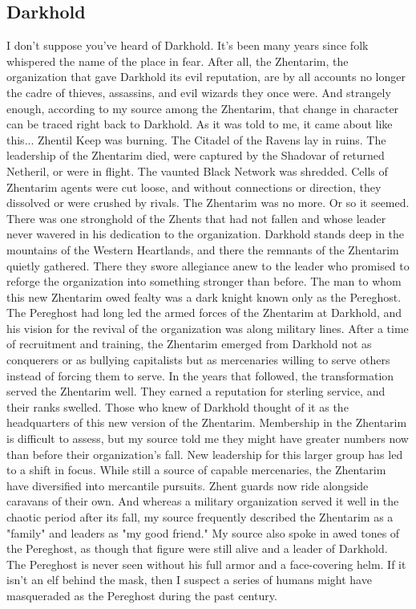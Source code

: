 \documentclass[10pt,a4paper,twoside,twocolumn,openany,bg=print,nodeprecatedcode]{dndbook}
\begin{document}
\subsection{Darkhold}
I don't suppose you've heard of Darkhold. It's been many years since folk whispered the name of the place in fear. After all, the Zhentarim, the organization that gave Darkhold its evil reputation, are by all accounts no longer the cadre of thieves, assassins, and evil wizards they once were. And strangely enough, according to my source among the Zhentarim, that change in character can be traced right back to Darkhold. As it was told to me, it came about like this...
Zhentil Keep was burning. The Citadel of the Ravens lay in ruins. The leadership of the Zhentarim died, were captured by the Shadovar of returned Netheril, or were in flight. The vaunted Black Network was shredded. Cells of Zhentarim agents were cut loose, and without connections or direction, they dissolved or were crushed by rivals. The Zhentarim was no more.
Or so it seemed. There was one stronghold of the Zhents that had not fallen and whose leader never wavered in his dedication to the organization. Darkhold stands deep in the mountains of the Western Heartlands, and there the remnants of the Zhentarim quietly gathered. There they swore allegiance anew to the leader who promised to reforge the organization into something stronger than before.
The man to whom this new Zhentarim owed fealty was a dark knight known only as the Pereghost. The Pereghost had long led the armed forces of the Zhentarim at Darkhold, and his vision for the revival of the organization was along military lines. After a time of recruitment and training, the Zhentarim emerged from Darkhold not as conquerers or as bullying capitalists but as mercenaries willing to serve others instead of forcing them to serve.
In the years that followed, the transformation served the Zhentarim well. They earned a reputation for sterling service, and their ranks swelled. Those who knew of Darkhold thought of it as the headquarters of this new version of the Zhentarim.
Membership in the Zhentarim is difficult to assess, but my source told me they might have greater numbers now than before their organization's fall. New leadership for this larger group has led to a shift in focus. While still a source of capable mercenaries, the Zhentarim have diversified into mercantile pursuits. Zhent guards now ride alongside caravans of their own. And whereas a military organization served it well in the chaotic period after its fall, my source frequently described the Zhentarim as a "family" and leaders as "my good friend."
My source also spoke in awed tones of the Pereghost, as though that figure were still alive and a leader of Darkhold. The Pereghost is never seen without his full armor and a face-covering helm. If it isn't an elf behind the mask, then I suspect a series of humans might have masqueraded as the Pereghost during the past century.
\end{document}

